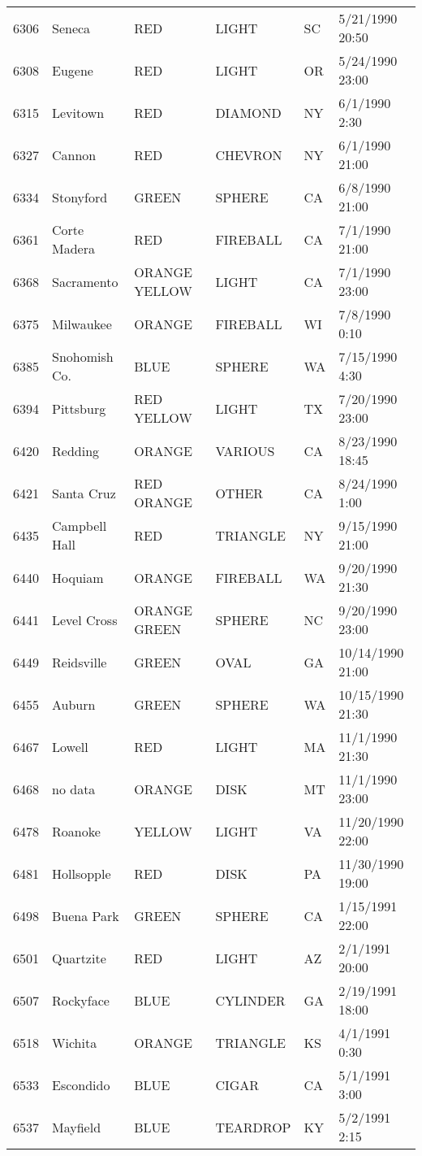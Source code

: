 \begin{tabular}{llllll}
6306 & Seneca & RED & LIGHT & SC & 5/21/1990 20:50 \\
6308 & Eugene & RED & LIGHT & OR & 5/24/1990 23:00 \\
6315 & Levitown & RED & DIAMOND & NY & 6/1/1990 2:30 \\
6327 & Cannon & RED & CHEVRON & NY & 6/1/1990 21:00 \\
6334 & Stonyford & GREEN & SPHERE & CA & 6/8/1990 21:00 \\
6361 & Corte Madera & RED & FIREBALL & CA & 7/1/1990 21:00 \\
6368 & Sacramento & ORANGE YELLOW & LIGHT & CA & 7/1/1990 23:00 \\
6375 & Milwaukee & ORANGE & FIREBALL & WI & 7/8/1990 0:10 \\
6385 & Snohomish Co. & BLUE & SPHERE & WA & 7/15/1990 4:30 \\
6394 & Pittsburg & RED YELLOW & LIGHT & TX & 7/20/1990 23:00 \\
6420 & Redding & ORANGE & VARIOUS & CA & 8/23/1990 18:45 \\
6421 & Santa Cruz & RED ORANGE & OTHER & CA & 8/24/1990 1:00 \\
6435 & Campbell Hall & RED & TRIANGLE & NY & 9/15/1990 21:00 \\
6440 & Hoquiam & ORANGE & FIREBALL & WA & 9/20/1990 21:30 \\
6441 & Level Cross & ORANGE GREEN & SPHERE & NC & 9/20/1990 23:00 \\
6449 & Reidsville & GREEN & OVAL & GA & 10/14/1990 21:00 \\
6455 & Auburn & GREEN & SPHERE & WA & 10/15/1990 21:30 \\
6467 & Lowell & RED & LIGHT & MA & 11/1/1990 21:30 \\
6468 & no data & ORANGE & DISK & MT & 11/1/1990 23:00 \\
6478 & Roanoke & YELLOW & LIGHT & VA & 11/20/1990 22:00 \\
6481 & Hollsopple & RED & DISK & PA & 11/30/1990 19:00 \\
6498 & Buena Park & GREEN & SPHERE & CA & 1/15/1991 22:00 \\
6501 & Quartzite & RED & LIGHT & AZ & 2/1/1991 20:00 \\
6507 & Rockyface & BLUE & CYLINDER & GA & 2/19/1991 18:00 \\
6518 & Wichita & ORANGE & TRIANGLE & KS & 4/1/1991 0:30 \\
6533 & Escondido & BLUE & CIGAR & CA & 5/1/1991 3:00 \\
6537 & Mayfield & BLUE & TEARDROP & KY & 5/2/1991 2:15 \\

\end{tabular}
